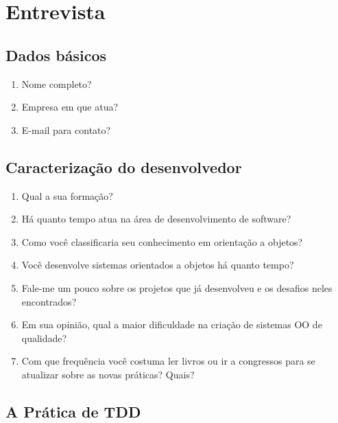 \chapter{Entrevista}
\label{ape:entrevista}
\section{Dados básicos}

\begin{enumerate}
	\item Nome completo?

	\item Empresa em que atua?

	\item E-mail para contato?

\end{enumerate}

\section{Caracterização do desenvolvedor}

\begin{enumerate}
	\item Qual a sua formação?

	\item Há quanto tempo atua na área de desenvolvimento de software?

	\item Como você classificaria seu conhecimento em orientação a objetos?

	\item Você desenvolve sistemas orientados a objetos há quanto tempo?	

	\item Fale-me um pouco sobre os projetos que já desenvolveu e os desafios 
	neles encontrados?

	\item Em sua opinião, qual a maior dificuldade na criação de sistemas OO de
	qualidade?

	\item Com que frequência você costuma ler livros ou ir a congressos para se 
	atualizar sobre as novas práticas? Quais?
\end{enumerate}

\section{A Prática de TDD}

